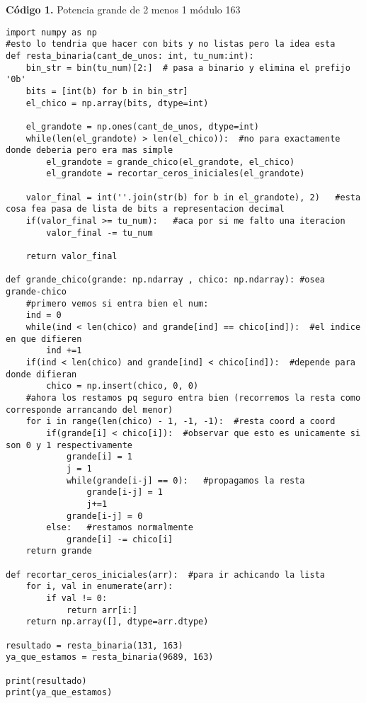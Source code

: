 \documentclass[12pt]{amsart}
\theoremstyle{plain}
\begin{document}
\newpage

\vspace{1em}
\noindent\textbf{Código 1.} Potencia grande de 2 menos 1 módulo 163
\label{codigo1}

\lstset{
    language=Python,         %
    basicstyle=\ttfamily\small,
    frame=single,
    breaklines=true
}

\begin{lstlisting}
import numpy as np
#esto lo tendria que hacer con bits y no listas pero la idea esta
def resta_binaria(cant_de_unos: int, tu_num:int):
    bin_str = bin(tu_num)[2:]  # pasa a binario y elimina el prefijo '0b'
    bits = [int(b) for b in bin_str]
    el_chico = np.array(bits, dtype=int)

    el_grandote = np.ones(cant_de_unos, dtype=int)
    while(len(el_grandote) > len(el_chico)):  #no para exactamente donde deberia pero era mas simple
        el_grandote = grande_chico(el_grandote, el_chico)
        el_grandote = recortar_ceros_iniciales(el_grandote)
        
    valor_final = int(''.join(str(b) for b in el_grandote), 2)   #esta cosa fea pasa de lista de bits a representacion decimal
    if(valor_final >= tu_num):   #aca por si me falto una iteracion
        valor_final -= tu_num
        
    return valor_final

def grande_chico(grande: np.ndarray , chico: np.ndarray): #osea grande-chico
    #primero vemos si entra bien el num:
    ind = 0
    while(ind < len(chico) and grande[ind] == chico[ind]):  #el indice en que difieren
        ind +=1
    if(ind < len(chico) and grande[ind] < chico[ind]):  #depende para donde difieran
        chico = np.insert(chico, 0, 0)
    #ahora los restamos pq seguro entra bien (recorremos la resta como corresponde arrancando del menor)
    for i in range(len(chico) - 1, -1, -1):  #resta coord a coord
        if(grande[i] < chico[i]):  #observar que esto es unicamente si son 0 y 1 respectivamente
            grande[i] = 1
            j = 1
            while(grande[i-j] == 0):   #propagamos la resta
                grande[i-j] = 1
                j+=1
            grande[i-j] = 0
        else:   #restamos normalmente
            grande[i] -= chico[i]
    return grande

def recortar_ceros_iniciales(arr):  #para ir achicando la lista
    for i, val in enumerate(arr):
        if val != 0:
            return arr[i:]
    return np.array([], dtype=arr.dtype)

resultado = resta_binaria(131, 163)
ya_que_estamos = resta_binaria(9689, 163)

print(resultado)
print(ya_que_estamos)   
\end{lstlisting}
\end{document}
